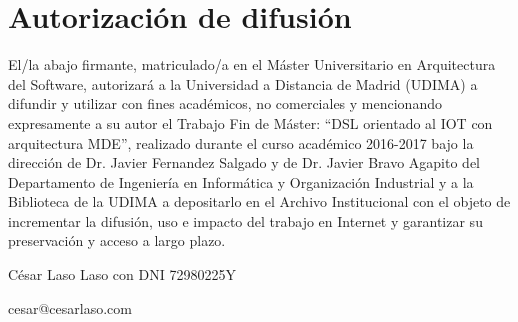 \chapter{Autorización de difusión}
 
El/la abajo firmante, matriculado/a en el Máster Universitario en Arquitectura del Software, autorizará a la Universidad a Distancia de Madrid (UDIMA) a difundir y utilizar con fines académicos, no comerciales y mencionando expresamente a su autor el Trabajo Fin de Máster: “DSL orientado al IOT con arquitectura MDE”, realizado durante el curso académico 2016-2017 bajo la dirección de Dr. Javier Fernandez Salgado y de Dr. Javier Bravo Agapito del Departamento de Ingeniería en Informática y Organización Industrial y a la Biblioteca de la UDIMA a depositarlo en el Archivo Institucional con el objeto de incrementar la difusión, uso e impacto del trabajo en Internet y garantizar su preservación y acceso a largo plazo.

César Laso Laso con DNI 72980225Y

cesar@cesarlaso.com
